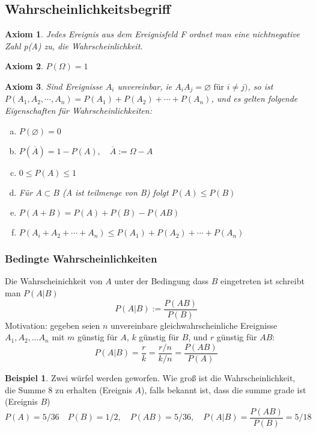 \documentclass[a4paper]{article}
\newtheorem{axiom}{Axiom}[section]
\theoremstyle{definition}
\newtheorem{beispiel}{Beispiel}%
\theoremstyle{remark}
\begin{document}
\subsection{Wahrscheinlichkeitsbegriff}
\label{sub:wahrscheinlichkeitsbegriff}
\begin{axiom}
Jedes Ereignis aus dem Ereignisfeld F ordnet man eine nichtnegative Zahl p(A) zu, die Wahrscheinlichkeit.
\end{axiom}
\begin{axiom}
$P(\Omega )=1$
\end{axiom}
\begin{axiom}
Sind Ereignisse $A_{i}$ unvereinbar, ie $A_iA_j=\varnothing \textrm{ für }i\neq j)$, so ist\\
$P(A_1,A_2,\cdots, A_n)= P(A_1)+P(A_2)+\cdots+ P(A_n)$,
und es gelten folgende Eigenschaften für Wahrscheinlichkeiten:
\begin{enumerate}[(a)]
  \item $ P(\varnothing)= 0$ 
  \item $ P(\overline{A})= 1-P(A),\quad \overline{A}:= \Omega -A$
  \item $0\leq P(A)\leq 1$
  \item Für $ A\subset B$ (A ist teilmenge von B) folgt $P(A) \leq P(B)$ 
  \item $ P(A+B)= P(A)+P(B)-P(AB)$
  \item $ P(A_i+A_2+\cdots+A_n)\leq P(A_1)+P(A_2)+\cdots+P(A_n)$
\end{enumerate}
\end{axiom}
  \subsubsection{Bedingte Wahrscheinlichkeiten} 
  \label{ssub:bedingte_wahrscheinlichkeiten}
  Die Wahrscheinichkeit von $A$ unter der  Bedingung dass $B$ eingetreten ist schreibt man $P(A|B)$
  \begin{equation}
    P(A|B):= \frac{P(AB)}{P(B)}
  \end{equation} 
  Motivation: gegeben seien $n$ unvereinbare gleichwahrscheinliche Ereignisse $A_1,A_2,\dots A_n$ mit $m$ günstig für $A$, $k$ günstig für $B$, und $r$ günstig für $AB$:
\begin{equation}
  P(A|B)= \frac{r}{k}=\frac{r/n}{k/n}=\frac{P(AB)}{P(A)}
\end{equation} 
\begin{beispiel}
 Zwei würfel werden geworfen. Wie groß ist die Wahrscheinlichkeit, die Summe 8 zu erhalten (Ereignis $A$), falls bekannt ist, dass die summe grade ist (Ereignis $B$)
\begin{equation*}
 P(A)=5/36 \quad P(B)=1/2, \quad P(AB)=5/36,\quad P(A|B)=\frac{P(AB)}{P(B)}=5/18
\end{equation*}
 
\end{beispiel}
\end{document}

